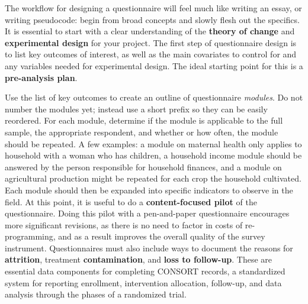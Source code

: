 The workflow for designing a questionnaire will feel much like writing an essay, or writing pseudocode:
begin from broad concepts and slowly flesh out the specifics.
It is essential to start with a clear understanding of the
\textbf{theory of change}
and \textbf{experimental design} for your project.
The first step of questionnaire design is to list key outcomes of interest,
as well as the main covariates to control for and any variables needed for experimental design.
The ideal starting point for this is a \textbf{pre-analysis plan}.

Use the list of key outcomes to create an outline of questionnaire \textit{modules}.
Do not number the modules yet; instead use a short prefix so they can be easily reordered.
For each module, determine if the module is applicable to the full sample,
the appropriate respondent, and whether or how often, the module should be repeated.
A few examples: a module on maternal health only applies to household with a woman who has children,
a household income module should be answered by the person responsible for household finances,
and a module on agricultural production might be repeated for each crop the household cultivated.
Each module should then be expanded into specific indicators to observe in the field.
At this point, it is useful to do a  \textbf{content-focused pilot}
of the questionnaire.
Doing this pilot with a pen-and-paper questionnaire encourages more significant revisions,
as there is no need to factor in costs of re-programming,
and as a result improves the overall quality of the survey instrument.
Questionnaires must also include ways to document the reasons for \textbf{attrition},
treatment \textbf{contamination}, and \textbf{loss to follow-up}.
These are essential data components for completing CONSORT records,
a standardized system for reporting enrollment, intervention allocation, follow-up,
and data analysis through the phases of a randomized trial.\cite{begg1996improving}

